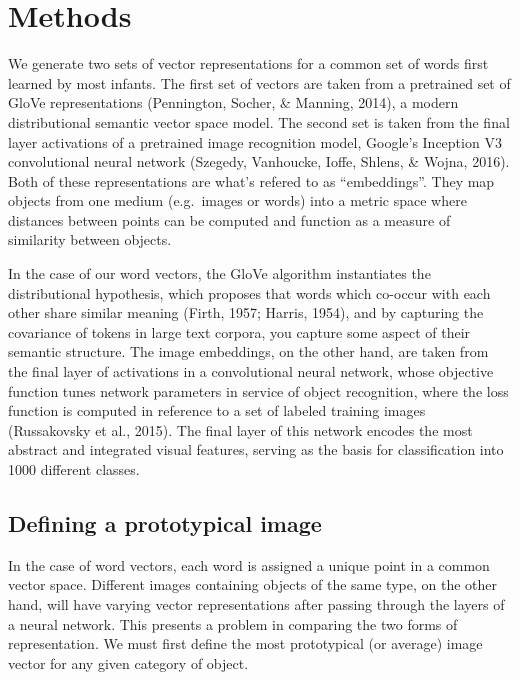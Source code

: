 \documentclass[10pt, letterpaper]{article}
\begin{document}
\section{Methods}\label{methods}

We generate two sets of vector representations for a common set of words
first learned by most infants. The first set of vectors are taken from a
pretrained set of GloVe representations (Pennington, Socher, \& Manning,
2014), a modern distributional semantic vector space model. The second
set is taken from the final layer activations of a pretrained image
recognition model, Google's Inception V3 convolutional neural network
(Szegedy, Vanhoucke, Ioffe, Shlens, \& Wojna, 2016). Both of these
representations are what's refered to as ``embeddings''. They map
objects from one medium (e.g.~images or words) into a metric space where
distances between points can be computed and function as a measure of
similarity between objects.

In the case of our word vectors, the GloVe algorithm instantiates the
distributional hypothesis, which proposes that words which co-occur with
each other share similar meaning (Firth, 1957; Harris, 1954), and by
capturing the covariance of tokens in large text corpora, you capture
some aspect of their semantic structure. The image embeddings, on the
other hand, are taken from the final layer of activations in a
convolutional neural network, whose objective function tunes network
parameters in service of object recognition, where the loss function is
computed in reference to a set of labeled training images (Russakovsky
et al., 2015). The final layer of this network encodes the most abstract
and integrated visual features, serving as the basis for classification
into 1000 different classes.

\subsection{Defining a prototypical
image}\label{defining-a-prototypical-image}

In the case of word vectors, each word is assigned a unique point in a
common vector space. Different images containing objects of the same
type, on the other hand, will have varying vector representations after
passing through the layers of a neural network. This presents a problem
in comparing the two forms of representation. We must first define the
most prototypical (or average) image vector for any given category of
object.
\end{document}
